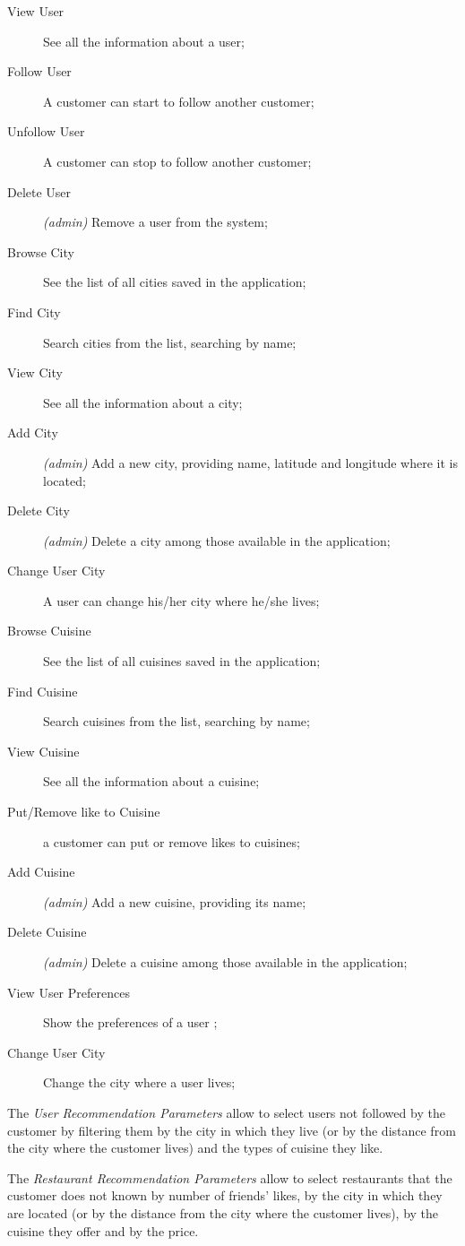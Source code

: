 \begin{description}
	\item[View User] See all the information about a user;
	\item[Follow User] A customer can start to follow another customer;
	\item[Unfollow User] A customer can stop to follow another customer;
	\item[Delete User] \textit{(admin)} Remove a user from the system;
	\item[Browse City] See the list of all cities saved in the application;
	\item[Find City] Search cities from the list, searching by name;
	\item[View City] See all the information about a city;
	\item[Add City] \textit{(admin)} Add a new city, providing name,
		latitude and longitude where it is located;
	\item[Delete City] \textit{(admin)} Delete a city among those available
		in the application;
	\item[Change User City] A user can change his/her city where he/she
		lives;
	\item[Browse Cuisine] See the list of all cuisines saved in the
		application;
	\item[Find Cuisine] Search cuisines from the list, searching by name;
	\item[View Cuisine] See all the information about a cuisine;
	\item[Put/Remove like to Cuisine] a customer can put or remove likes to
		cuisines;
	\item[Add Cuisine] \textit{(admin)} Add a new cuisine, providing its
		name;
	\item[Delete Cuisine] \textit{(admin)} Delete a cuisine among those
		available in the application;
	\item[View User Preferences] Show the preferences of a user ;
	\item[Change User City]  Change the city where a user lives;
\end{description}

The \textit{User Recommendation Parameters} allow to select users not followed
by the customer by filtering them by the city in which they live (or by the
distance from the city where the customer lives) and the types of cuisine they
like.

The \textit{Restaurant Recommendation Parameters} allow to select restaurants
that the customer does not known by number of friends' likes, by the city in
which they are located (or by the distance from the city where the customer
lives), by the cuisine they offer and by the price.
